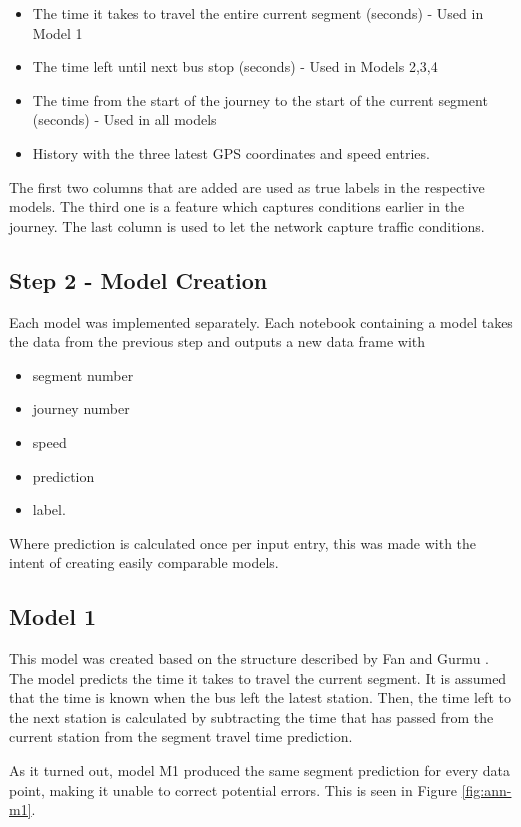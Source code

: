 \begin{itemize}
    \item The time it takes to travel the entire current segment (seconds) - Used in Model 1
    \item The time left until next bus stop (seconds) - Used in Models 2,3,4
    \item The time from the start of the journey to the start of the current segment (seconds) - Used in all models
    \item History with the three latest GPS coordinates and speed entries.
\end{itemize}

\noindent The first two columns that are added are used as true labels in the respective models. The third one is a feature which captures conditions earlier in the journey. The last column is used to let the network capture traffic conditions.

\subsection{Step 2 - Model Creation}
Each model was implemented separately. Each notebook containing a model takes the data from the previous step and outputs a new data frame with 

\begin{itemize}
    \item segment number
    \item journey number
    \item speed
    \item prediction
    \item label.
\end{itemize}

Where prediction is calculated once per input entry, this was made with the intent of creating easily comparable models.

\subsection{Model 1}
This model was created based on the structure described by Fan and Gurmu \cite{brazilANN}. The model predicts the time it takes to travel the current segment. It is assumed that the time is known when the bus left the latest station. Then, the time left to the next station is calculated by subtracting the time that has passed from the current station from the segment travel time prediction.

As it turned out, model M1 produced the same segment prediction for every data point, making it unable to correct potential errors. This is seen in Figure \ref{fig:ann-m1}.

